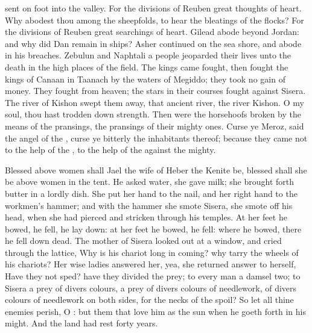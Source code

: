 {sent on
foot into the
valley. For the
divisions of
Reuben
{}
great
thoughts of
heart.
Why
abodest thou
among the
sheepfolds, to
hear the
bleatings of the
flocks? For the
divisions of
Reuben
{}
great
searchings of
heart.
Gilead
abode
beyond
Jordan: and why did
Dan
remain in
ships?
Asher
continued on the
sea
shore, and
abode in his
breaches.
Zebulun and
Naphtali
{} a
people
{}
jeoparded their
lives unto the
death in the high
places of the
field.
The
kings
came
{}
fought, then
fought the
kings of
Canaan in
Taanach by the
waters of
Megiddo; they
took no
gain of
money.
They
fought from
heaven; the
stars in their
courses
fought against
Sisera.
The
river of
Kishon swept them
away, that
ancient
river, the
river
Kishon. O my
soul, thou hast trodden
down
strength.
Then were the
horsehoofs
broken by the means of the
pransings, the
pransings of their mighty
ones.
Curse ye
Meroz,
said the
angel of the
{},
curse ye
bitterly the
inhabitants thereof; because they
came not to the
help of the
{}, to the
help of the
{} against the
mighty.
\par }{\PP {}Blessed above
women shall
Jael the
wife of
Heber the
Kenite be,
blessed shall she be above
women in the
tent.
He
asked
water,
{} she
gave
{}
milk; she brought
forth
butter in a
lordly
dish.
She
put her
hand to the
nail, and her right
hand to the
workmen’s
hammer; and with the hammer she
smote
Sisera, she smote
off his
head, when she had
pierced and stricken
through his
temples.
At her
feet he
bowed, he
fell, he lay
down: at her
feet he
bowed, he
fell:
where he
bowed, there he fell
down
dead.
The
mother of
Sisera
looked out at a
window, and
cried through the
lattice, Why is his
chariot
{}
long in
coming? why
tarry the
wheels of his
chariots?
Her
wise
ladies
answered her, yea, she
returned
answer to herself,
Have they not
sped? have they
{}
divided the
prey; to
every
man a
damsel
{}
two; to
Sisera a
prey of divers
colours, a
prey of divers
colours of
needlework, of divers
colours of needlework on both
sides,
{} for the
necks of
{} the
spoil?
So let all thine
enemies
perish, O
{}: but
{} them that
love him
{} as the
sun when he goeth
forth in his
might. And the
land had
rest
forty
years.

}
